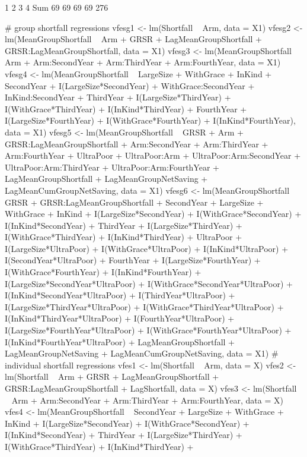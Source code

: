 \begin{Schunk}
\begin{Soutput}
  1   2   3   4 Sum 
 69  69  69  69 276 
\end{Soutput}
\begin{Sinput}
# group shortfall regressions
vfesg1 <- lm(Shortfall  ~ Arm, data = X1)
vfesg2 <- lm(MeanGroupShortfall  ~ Arm +
  GRSR + LagMeanGroupShortfall + GRSR:LagMeanGroupShortfall, data = X1)
vfesg3 <- lm(MeanGroupShortfall ~  
  Arm + Arm:SecondYear + Arm:ThirdYear + Arm:FourthYear, 
  data = X1)
vfesg4 <- lm(MeanGroupShortfall ~  
  LargeSize + WithGrace + InKind + 
  SecondYear +
  I(LargeSize*SecondYear) + WithGrace:SecondYear + InKind:SecondYear + 
  ThirdYear +
  I(LargeSize*ThirdYear) + I(WithGrace*ThirdYear) + I(InKind*ThirdYear) +
  FourthYear +
  I(LargeSize*FourthYear) + I(WithGrace*FourthYear) + I(InKind*FourthYear),
  data = X1)
vfesg5 <- lm(MeanGroupShortfall ~ 
  GRSR + Arm + GRSR:LagMeanGroupShortfall + 
  Arm:SecondYear + Arm:ThirdYear  + Arm:FourthYear + 
  UltraPoor + UltraPoor:Arm + 
  UltraPoor:Arm:SecondYear + UltraPoor:Arm:ThirdYear  + UltraPoor:Arm:FourthYear +
  LagMeanGroupShortfall +
  LagMeanGroupNetSaving + LagMeanCumGroupNetSaving,
  data = X1)
vfesg6 <- lm(MeanGroupShortfall ~ 
  GRSR + GRSR:LagMeanGroupShortfall + 
  SecondYear + LargeSize + WithGrace + InKind +
  I(LargeSize*SecondYear) + I(WithGrace*SecondYear) + I(InKind*SecondYear) + 
  ThirdYear +
  I(LargeSize*ThirdYear) + I(WithGrace*ThirdYear) + I(InKind*ThirdYear) +
  UltraPoor + 
  I(LargeSize*UltraPoor) + I(WithGrace*UltraPoor) + I(InKind*UltraPoor) + 
  I(SecondYear*UltraPoor) +
  FourthYear +
  I(LargeSize*FourthYear) + I(WithGrace*FourthYear) + I(InKind*FourthYear) +
  I(LargeSize*SecondYear*UltraPoor) + I(WithGrace*SecondYear*UltraPoor) + 
  I(InKind*SecondYear*UltraPoor) + 
  I(ThirdYear*UltraPoor) +
  I(LargeSize*ThirdYear*UltraPoor) + I(WithGrace*ThirdYear*UltraPoor) + 
  I(InKind*ThirdYear*UltraPoor) + 
  I(FourthYear*UltraPoor) +
  I(LargeSize*FourthYear*UltraPoor) + I(WithGrace*FourthYear*UltraPoor) + 
  I(InKind*FourthYear*UltraPoor) + 
  LagMeanGroupShortfall +
  LagMeanGroupNetSaving + LagMeanCumGroupNetSaving,
  data = X1)
# individual shortfall regressions
vfes1 <- lm(Shortfall  ~ Arm, data = X)
vfes2 <- lm(Shortfall  ~ Arm +
  GRSR + LagMeanGroupShortfall + GRSR:LagMeanGroupShortfall
  + LagShortfall, data = X)
vfes3 <- lm(Shortfall  ~ 
  Arm + Arm:SecondYear + Arm:ThirdYear + Arm:FourthYear, 
  data = X)
vfes4 <- lm(MeanGroupShortfall ~  
  SecondYear + LargeSize + WithGrace + InKind +
  I(LargeSize*SecondYear) + I(WithGrace*SecondYear) + I(InKind*SecondYear) + 
  ThirdYear +
  I(LargeSize*ThirdYear) + I(WithGrace*ThirdYear) + I(InKind*ThirdYear) +

\end{Sinput}
\end{Schunk}
